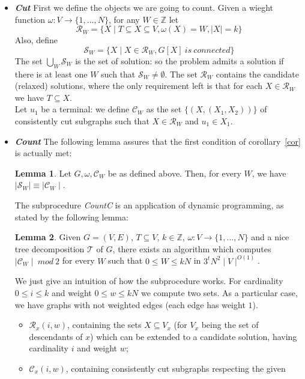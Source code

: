 \documentclass{article}
\theoremstyle{definition}
\theoremstyle{lemma}
\newtheorem{lemma}{Lemma}[section]
\theoremstyle{corollary}
\theoremstyle{theorem}
\begin{document}
\begin{itemize}
	\item \textbf{\emph{Cut}} First we define the objects we are going to count.
	Given a wieght function $\omega : V \rightarrow \{ 1,...,N\}$, for any $W \in \mathbb{Z}$ let
	\[\mathcal{R}_W = \{ X \mid T \subseteq X \subseteq V, \omega(X) = W, \mid X \mid = k \}\]
	Also, define
	\[\mathcal{S}_W = \{ X \mid X \in \mathcal{R}_W, G[X] \ is \ connected \}\]
	The set $\bigcup_W \mathcal{S}_W$ is the set of solution: so the problem admits
	a solution if there is at least one $W$ such that $\mathcal{S}_W \not = \emptyset$. The set
	$\mathcal{R}_W$ contains the candidate (relaxed) solutions, where the only requirement left
	is that for each $X \in \mathcal{R}_W$ we have $T \subseteq X$. \\
	Let $u_1$ be a terminal: we define $\mathcal{C}_W$ as the set 
	$\{ (X, (X_1,X_2)) \}$ of consistently cut subgraphs such that $X \in \mathcal{R}_W$ and
	$u_1 \in X_1$.
	\item \textbf{\emph{Count}} The following lemma assures that the first condition of 
	corollary~\ref{cor} is actually met:
	\begin{lemma}
		Let $G,\omega,\mathcal{C}_W$ be as defined above. Then, for every $W$, we have
		$\mid \mathcal{S}_W \mid \equiv \mid \mathcal{C}_W \mid$.
	\end{lemma}
	The subprocedure \emph{CountC} is an application of dynamic programming, as stated by the following
	lemma:
	\begin{lemma}
		Given $G = (V,E)$, $T \subseteq V$, $k \in \mathbb{Z}$, $\omega : V \rightarrow \{ 1,...,N \}$ 
		and	a nice tree decomposition $\mathcal{T}$ of $G$, there exists an algorithm which computes 
		$\mid \mathcal{C}_W \mid \ mod \ 2$ for every $W$ such that $0 \leq W \leq kN$ in
		$3^t N^2 \mid V \mid^{O(1)}$.
	\end{lemma}
	We just give an intuition of how the subprocedure works. For cardinality $0 \leq i \leq k$ and weight
	$0 \leq w \leq kN$ we compute two sets. As a particular case, we have graphs with not
	weighted edges (each edge has weight $1$).
	\begin{itemize}
		\item $\mathcal{R}_x(i,w)$, containing the sets $X \subseteq V_x$ (for $V_x$ being the set of
		descendants of $x$) which can be extended to a candidate solution, having cardinality $i$ and
		weight $w$;
		\item $\mathcal{C}_x(i,w)$, containing consistently cut subgraphs respecting the given

\end{itemize}
\end{itemize}
\end{document}
